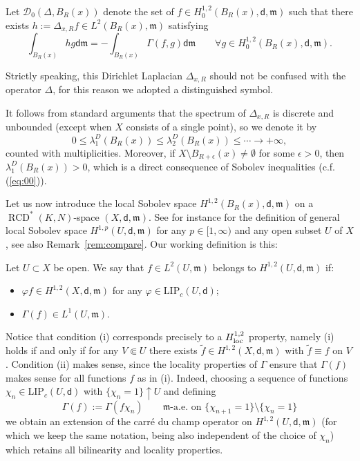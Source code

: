 \documentclass[a4paper,11pt,reqno]{article}
\numberwithin{equation}{section}
\theoremstyle{plain}
\theoremstyle{definition}
\theoremstyle{remark}
\let\altphi\phi
\let\phi\varphi
\let\varphi\altphi
\let\altphi\undefined
\newcommand{\dist}{\mathsf{d}}
\newcommand{\meas}{\mathfrak{m}}
\DeclareMathOperator{\RCD}{RCD}
\begin{document}
\begin{definition}\label{def:dlapballs}
Let $\mathcal{D}_0(\Delta, B_R(x))$ denote the set of $f \in H^{1, 2}_0(B_R(x), \dist, \meas)$ such that 
there exists $h:=\Delta_{x,R} f\in L^2(B_R(x),\meas)$ satisfying
$$\int_{B_R(x)} hg\dist\meas=-\int_{B_R(x)} \Gamma(f,g)\dist\meas\qquad\forall g\in H^{1,2}_0(B_R(x),\dist,\meas).
$$
\end{definition}

Strictly speaking, this Dirichlet Laplacian $\Delta_{x,R}$ should not be confused with the operator $\Delta$, for this reason we adopted a
distinguished symbol.

It follows from standard arguments that the spectrum of $\Delta_{x,R}$ is discrete and unbounded
(except when $X$ consists of a single point), so we denote it by 
$$
0\le \lambda_1^D(B_R(x)) \le \lambda^D_2(B_R(x)) \le \cdots \to +\infty,
$$
counted with multiplicities.
Moreover, if $X \setminus B_{R+\epsilon}(x) \neq \emptyset$ for some $\epsilon>0$, then $\lambda_1^D(B_R(x))>0$, which is a direct consequence of Sobolev inequalities (c.f. (\ref{eq:00})).

Let us now introduce the local Sobolev space $H^{1, 2}(B_R(x), \dist, \meas)$ on a $\RCD^*(K, N)$-space $(X, \dist, \meas)$. See for instance \cite{Cheeger,Shanmugalingam} for the definition of general local Sobolev space $H^{1, p}(U, \dist, \meas)$ for any $p \in [1, \infty)$ and any open subset $U$ of $X$, see also Remark~\ref{rem:compare}. Our working definition is this:

\begin{definition}[$H^{1,2}(U,\dist,\meas)$-Sobolev space]\label{def:reddu}
Let $U\subset X$ be open. We say that $f\in L^2(U,\meas)$ belongs to $H^{1,2}(U,\dist,\meas)$ if:
\begin{itemize} 
\item[(i)] $\phi f \in H^{1, 2}(X, \dist, \meas)$ for any $\phi \in \mathrm{LIP}_c(U, \dist)$;
\item[(ii)] $\Gamma(f)\in L^1(U,\meas)$. 
\end{itemize}
\end{definition}

Notice that condition (i) corresponds precisely to a $H^{1,2}_{\rm loc}$ property, namely (i)
holds if and only if  for any $V\Subset U$ there exists $\tilde f\in H^{1,2}(X,\dist,\meas)$ with $\tilde f\equiv f$ on $V$.
Condition (ii) makes sense, since the locality properties of $\Gamma$ ensure that $\Gamma(f)$ makes sense for all 
functions $f$ as in (i). Indeed, choosing
a sequence of functions $\chi_n\in \mathrm{LIP}_c(U, \dist)$ with $\{\chi_n=1\}\uparrow U$ and defining
$$
\Gamma(f):=\Gamma(f\chi_n)\qquad\text{$\meas$-a.e. on $\{\chi_{n+1}=1\}\setminus\{\chi_n=1\}$}
$$
we obtain an extension of the carr\'e du champ operator on $H^{1,2}(U,\dist,\meas)$
(for which we keep the same notation, being also independent of the choice of $\chi_n$) 
which retains all bilinearity and locality properties.  
\end{document}
